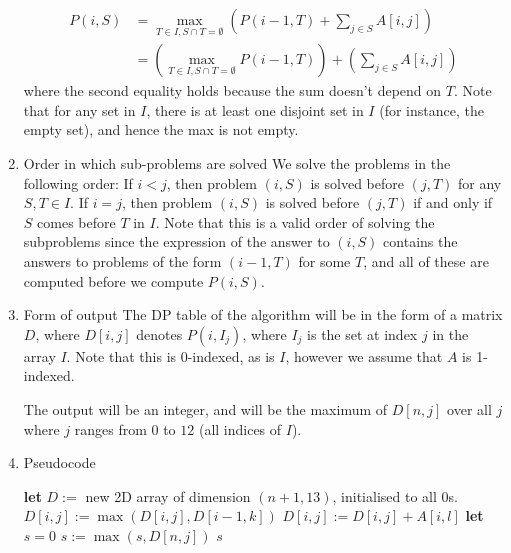 \begin{enumerate}
\begin{align*}
    P(i, S) &= \max_{T \in I, S \cap T = \emptyset} \left(P(i - 1, T) + \sum_{j \in S} A[i, j]\right)\\
            &= \left(\max_{T \in I, S \cap T = \emptyset} P(i - 1, T)\right) + \left(\sum_{j \in S} A[i, j]\right)
\end{align*}
where the second equality holds because the sum doesn't depend on $T$.\nl
Note that for any set in $I$, there is at least one disjoint set in $I$ (for instance, the empty set), and hence the max is not empty.
\item Order in which sub-problems are solved\nl
We solve the problems in the following order:\nl
If $i < j$, then problem $(i, S)$ is solved before $(j, T)$ for any $S, T \in I$. If $i = j$, then problem $(i, S)$ is solved before $(j, T)$ if and only if $S$ comes before $T$ in $I$. Note that this is a valid order of solving the subproblems since the expression of the answer to $(i, S)$ contains the answers to problems of the form $(i - 1, T)$ for some $T$, and all of these are computed before we compute $P(i, S)$.
\item Form of output\nl
The DP table of the algorithm will be in the form of a matrix $D$, where $D[i, j]$ denotes $P(i, I_j)$, where $I_j$ is the set at index $j$ in the array $I$. Note that this is 0-indexed, as is $I$, however we assume that $A$ is 1-indexed.

The output will be an integer, and will be the maximum of $D[n, j]$ over all $j$ where $j$ ranges from $0$ to $12$ (all indices of $I$).

\item Pseudocode

\begin{algorithmic}[1]
        \State \textbf{let} $D := $ new 2D array of dimension $(n + 1, 13)$, initialised to all $0$s.
                        \State $D[i, j] := \max(D[i, j], D[i - 1, k])$
                    \EndIf
                \EndFor
                    \State $D[i, j] := D[i, j] + A[i, l]$
                \EndFor
            \EndFor
        \EndFor
        \State \textbf{let} $s = 0$
            \State $s := \max(s, D[n, j])$
        \EndFor
        \State \Return $s$
    \EndFunction
\end{algorithmic}


\end{enumerate}

